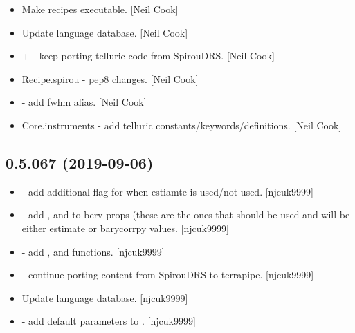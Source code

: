 \documentclass[a4paper,10pt,english]{report}
\begin{document}
\begin{itemize}
\item {} 
Make recipes executable. {[}Neil Cook{]}

\item {} 
Update language database. {[}Neil Cook{]}

\item {} 
 +  - keep porting telluric code from
SpirouDRS. {[}Neil Cook{]}

\item {} 
Recipe.spirou - pep8 changes. {[}Neil Cook{]}

\item {} 
 - add fwhm alias. {[}Neil Cook{]}

\item {} 
Core.instruments - add telluric constants/keywords/definitions. {[}Neil
Cook{]}

\end{itemize}


\subsection{0.5.067 (2019-09-06)}
\label{\detokenize{misc/changelog:id76}}\begin{itemize}
\item {} 
 - add additional flag for when estiamte is
used/not used. {[}njcuk9999{]}

\item {} 
 - add ,  and  to berv props
(these are the ones that should be used and will be either estimate or
barycorrpy values. {[}njcuk9999{]}

\item {} 
 - add ,
 and  functions. {[}njcuk9999{]}

\item {} 
 - continue porting content from SpirouDRS to
terrapipe. {[}njcuk9999{]}

\item {} 
Update language database. {[}njcuk9999{]}

\item {} 
 - add default parameters to .
{[}njcuk9999{]}

\end{itemize}
\end{document}
